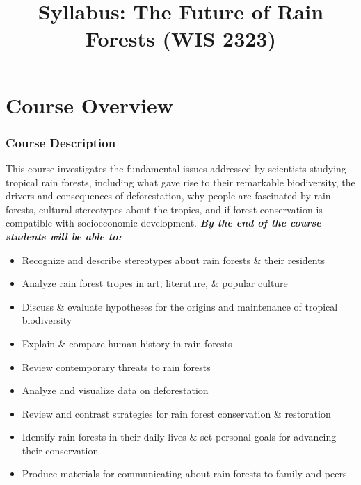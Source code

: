 \documentclass[
  10pt,
  letterpaper,
  oneside,
  open=any]{scrbook}
\title{Syllabus: The Future of Rain Forests (WIS 2323)}
\author{}
\date{}
\providecommand{\tightlist}{%
  \setlength{\itemsep}{0pt}\setlength{\parskip}{0pt}}\usepackage{longtable,booktabs,array}
\renewcommand*\contentsname{Table of contents}
\newcommand\contentsname{Table of contents}
\begin{document}
\frontmatter
\maketitle

\renewcommand*\contentsname{Table of Contents}
{
\hypersetup{linkcolor=}
\setcounter{tocdepth}{0}
\tableofcontents
}
\mainmatter
{}

\chapter{Course Overview}\label{course-overview}

\subsection*{Course Description}\label{course-description}

This course investigates the fundamental issues addressed by scientists
studying tropical rain forests, including what gave rise to their
remarkable biodiversity, the drivers and consequences of deforestation,
why people are fascinated by rain forests, cultural stereotypes about
the tropics, and if forest conservation is compatible with socioeconomic
development. \textbf{\emph{By the end of the course students will be
able to:}}

\begin{itemize}
\tightlist
\item
  Recognize and describe stereotypes about rain forests \& their
  residents
\item
  Analyze rain forest tropes in art, literature, \& popular culture
\item
  Discuss \& evaluate hypotheses for the origins and maintenance of
  tropical biodiversity
\item
  Explain \& compare human history in rain forests
\item
  Review contemporary threats to rain forests
\item
  Analyze and visualize data on deforestation
\item
  Review and contrast strategies for rain forest conservation \&
  restoration
\item
  Identify rain forests in their daily lives \& set personal goals for
  advancing their conservation
\item
  Produce materials for communicating about rain forests to family and
  peers
\end{itemize}
\end{document}
